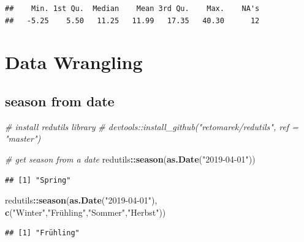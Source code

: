 \documentclass[
]{book}
\newenvironment{Shaded}{\begin{snugshade}}{\end{snugshade}}
\newcommand{\CommentTok}[1]{\textcolor[rgb]{0.56,0.35,0.01}{\textit{#1}}}
\newcommand{\DataTypeTok}[1]{\textcolor[rgb]{0.13,0.29,0.53}{#1}}
\newcommand{\KeywordTok}[1]{\textcolor[rgb]{0.13,0.29,0.53}{\textbf{#1}}}
\newcommand{\NormalTok}[1]{#1}
\newcommand{\OperatorTok}[1]{\textcolor[rgb]{0.81,0.36,0.00}{\textbf{#1}}}
\newcommand{\StringTok}[1]{\textcolor[rgb]{0.31,0.60,0.02}{#1}}
\begin{document}
\begin{verbatim}
##    Min. 1st Qu.  Median    Mean 3rd Qu.    Max.    NA's 
##   -5.25    5.50   11.25   11.99   17.35   40.30      12
\end{verbatim}

\hypertarget{data-wrangling}{%
\section{Data Wrangling}\label{data-wrangling}}

\hypertarget{season-from-date}{%
\subsection{season from date}\label{season-from-date}}

\begin{Shaded}
\begin{Highlighting}[]
\CommentTok{# install redutils library}
\CommentTok{# devtools::install_github("retomarek/redutils", ref = "master")}

\CommentTok{# get season from a date}
\NormalTok{redutils}\OperatorTok{::}\KeywordTok{season}\NormalTok{(}\KeywordTok{as.Date}\NormalTok{(}\StringTok{"2019-04-01"}\NormalTok{))}
\end{Highlighting}
\end{Shaded}

\begin{verbatim}
## [1] "Spring"
\end{verbatim}

\begin{Shaded}
\begin{Highlighting}[]
\NormalTok{redutils}\OperatorTok{::}\KeywordTok{season}\NormalTok{(}\KeywordTok{as.Date}\NormalTok{(}\StringTok{"2019-04-01"}\NormalTok{), }\KeywordTok{c}\NormalTok{(}\StringTok{"Winter"}\NormalTok{,}\StringTok{"Frühling","}\NormalTok{Sommer}\StringTok{","}\NormalTok{Herbst}\StringTok{"))}
\end{Highlighting}
\end{Shaded}

\begin{verbatim}
## [1] "Frühling"
\end{verbatim}

\begin{Shaded}
\end{Shaded}
\end{document}
